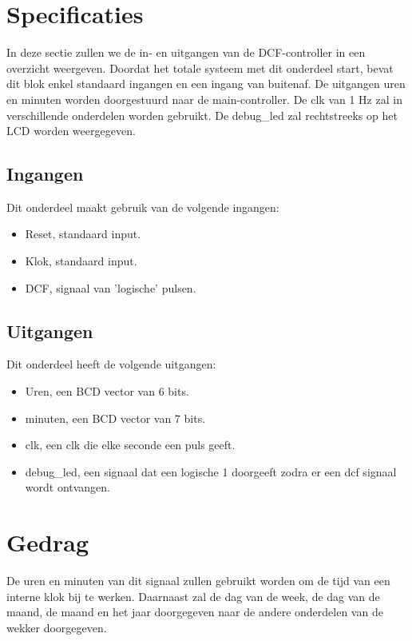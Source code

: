 \section{Specificaties}
In deze sectie zullen we de in- en uitgangen van de DCF-controller in een overzicht weergeven. Doordat het totale systeem met dit onderdeel start, bevat dit blok enkel standaard ingangen en een ingang van buitenaf. De uitgangen uren en minuten worden doorgestuurd naar de main-controller. De clk van 1 Hz zal in verschillende onderdelen worden gebruikt. De debug\_led zal rechtstreeks op het LCD worden weergegeven. 
\subsection{Ingangen}
Dit onderdeel maakt gebruik van de volgende ingangen: 

\begin{itemize}[nolistsep]
\item Reset, standaard input.
\item Klok, standaard input.
\item DCF, signaal van 'logische' pulsen.
\end{itemize}
\noindent

\subsection{Uitgangen}
Dit onderdeel heeft de volgende uitgangen:
\begin{itemize}[nolistsep]
\item Uren, een BCD vector van 6 bits.
\item minuten, een BCD vector van 7 bits.
\item clk, een clk die elke seconde een puls geeft.
\item debug\_led, een signaal dat een logische 1 doorgeeft zodra er een dcf signaal wordt ontvangen.
\end{itemize}


\section{Gedrag}
 De uren en minuten van dit signaal zullen gebruikt worden om de tijd van een interne klok bij te werken. Daarnaast zal de dag van de week, de dag van de maand, de maand en het jaar doorgegeven naar de andere onderdelen van de wekker doorgegeven.
